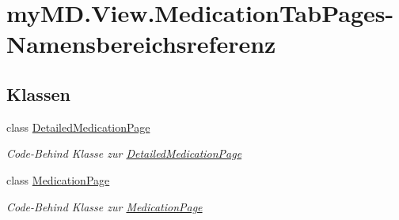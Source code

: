 \hypertarget{namespacemy_m_d_1_1_view_1_1_medication_tab_pages}{}\section{my\+M\+D.\+View.\+Medication\+Tab\+Pages-\/\+Namensbereichsreferenz}
\label{namespacemy_m_d_1_1_view_1_1_medication_tab_pages}
\subsection*{Klassen}
\begin{DoxyCompactItemize}
\item 
class \mbox{\hyperlink{classmy_m_d_1_1_view_1_1_medication_tab_pages_1_1_detailed_medication_page}{Detailed\+Medication\+Page}}
\begin{DoxyCompactList}\small\item\em Code-\/\+Behind Klasse zur \mbox{\hyperlink{classmy_m_d_1_1_view_1_1_medication_tab_pages_1_1_detailed_medication_page}{Detailed\+Medication\+Page}} \end{DoxyCompactList}\item 
class \mbox{\hyperlink{classmy_m_d_1_1_view_1_1_medication_tab_pages_1_1_medication_page}{Medication\+Page}}
\begin{DoxyCompactList}\small\item\em Code-\/\+Behind Klasse zur \mbox{\hyperlink{classmy_m_d_1_1_view_1_1_medication_tab_pages_1_1_medication_page}{Medication\+Page}} \end{DoxyCompactList}\end{DoxyCompactItemize}
